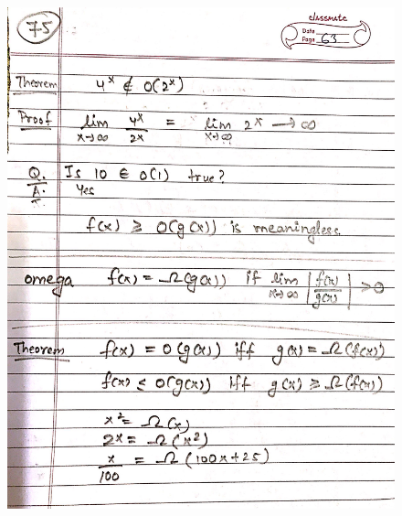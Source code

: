 \begin{figure}[H]
    \centering
    \includegraphics[scale=0.25]{"./MIT-6.042J/MIT-6042J-075"}
\end{figure}
\newpage
